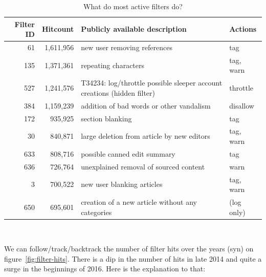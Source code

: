 \begin{table}
  \centering
    \begin{tabular}{r r p{8cm} p{2cm} }
        Filter ID & Hitcount & Publicly available description & Actions \\
    \hline
       61 & 1,611,956 & new user removing references & tag \\
      135 & 1,371,361 & repeating characters & tag, warn \\
      527 & 1,241,576 & T34234: log/throttle possible sleeper account creations (hidden filter) & throttle \\
      384 & 1,159,239 & addition of bad words or other vandalism & disallow \\
      172 & 935,925 & section blanking & tag \\
       30 & 840,871 & large deletion from article by new editors & tag, warn \\
      633 & 808,716 & possible canned edit summary & tag \\
      636 & 726,764 & unexplained removal of sourced content & warn \\
        3 & 700,522 & new user blanking articles & tag, warn \\
      650 & 695,601 & creation of a new article without any categories & (log only) \\
  \end{tabular}
  \caption{What do most active filters do?}~\label{tab:most-active-actions}
\end{table}


We can follow/track/backtrack the number of filter hits over the years (syn) on figure~\ref{fig:filter-hits}.
There is a dip in the number of hits in late 2014 and quite a surge in the beginnings of 2016.
Here is the explanation to that:

